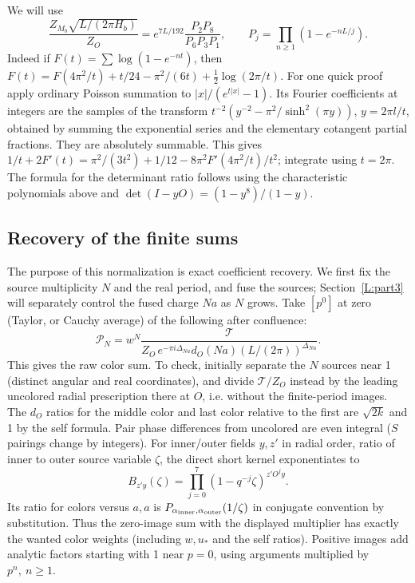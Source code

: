 We will use
\[
 \frac{Z_{M_b}\sqrt{L/(2\pi H_b)}}{Z_O}
 = e^{7L/192}\frac{P_2 P_8}{P_6 P_3 P_1},\qquad
 P_j=\prod_{n\ge1}(1-e^{-nL/j}).
\]
Indeed if \(F(t)=\sum\log(1-e^{-nt})\), then \(F(t)=F(4\pi^2/t)+t/24-\pi^2/(6t)+\frac12\log(2\pi/t)\). For one quick proof apply ordinary Poisson summation to \(|x|/(e^{t|x|}-1)\). Its Fourier coefficients at integers are the samples of the transform \(t^{-2}(y^{-2}-\pi^2/\sinh^2(\pi y))\), \(y=2\pi l/t\), obtained by summing the exponential series and the elementary cotangent partial fractions. They are absolutely summable. This gives \(1/t+2F'(t)=\pi^2/(3t^2)+1/12-8\pi^2 F'(4\pi^2/t)/t^2\); integrate using \(t=2\pi\). The formula for the determinant ratio follows using the characteristic polynomials above and \(\det(I-yO)=(1-y^8)/(1-y)\).

\subsection{Recovery of the finite sums}\label{L:step5}

The purpose of this normalization is exact coefficient recovery. We first
fix the source multiplicity $N$ and the real period, and fuse the sources;
Section~\ref{L:part3} will separately control the fused charge $Na$ as
$N$ grows. Take \([p^0]\) at zero (Taylor, or Cauchy average) of the
following after confluence:
\[
 \mathscr P_N= w^N
 \frac{\mathcal T}{Z_O\,e^{-\pi i\Delta_{Na}}d_O(Na)(L/(2\pi))^{\Delta_{Na}}}.
\]
This gives the raw color sum. To check, initially separate the \(N\) sources near 1 (distinct angular and real coordinates), and divide \(\mathcal T/Z_O\) instead by the leading uncolored radial prescription there at \(O\), i.e. without the finite-period images. The \(d_O\) ratios for the middle color and last color relative to the first are \(\sqrt{2k}\) and 1 by the self formula. Pair phase differences from uncolored are even integral (\(S\) pairings change by integers). For inner/outer fields \(y,z'\) in radial order, ratio of inner to outer source variable \(\zeta\), the direct short kernel exponentiates to
\[
 B_{z'y}(\zeta)=\prod_{j=0}^7(1-q^{-j}\zeta)^{z'O^j y}.
\]
Its ratio for colors versus \(a,a\) is \(P_{\alpha_{\rm inner},\alpha_{\rm outer}}(1/\zeta)\) in conjugate convention by substitution. Thus the zero-image sum with the displayed multiplier has exactly the wanted color weights (including \(w,u_*\) and the self ratios). Positive images add analytic factors starting with 1 near \(p=0\), using arguments multiplied by \(p^n,\ n\ge1\).

